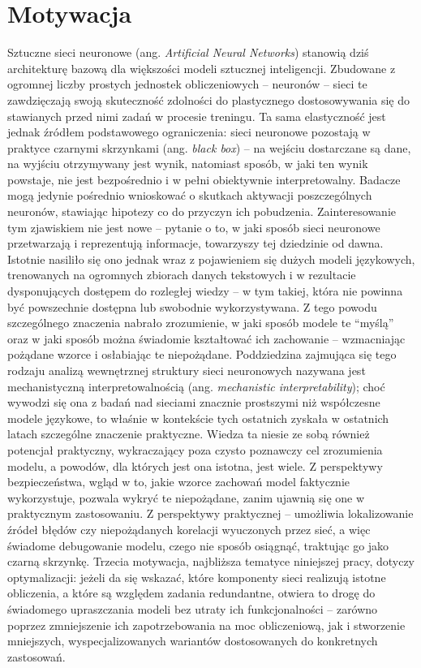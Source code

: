 \section{Motywacja}
\label{sec:motywacja}
Sztuczne sieci neuronowe (ang. \textit{Artificial Neural Networks}) stanowią dziś architekturę bazową dla większości modeli sztucznej inteligencji. Zbudowane z ogromnej liczby prostych jednostek obliczeniowych -- neuronów -- sieci te zawdzięczają swoją skuteczność zdolności do plastycznego dostosowywania się do stawianych przed nimi zadań w procesie treningu. Ta sama elastyczność jest jednak źródłem podstawowego ograniczenia: sieci neuronowe pozostają w praktyce czarnymi skrzynkami (ang. \textit{black box}) -- na wejściu dostarczane są dane, na wyjściu otrzymywany jest wynik, natomiast sposób, w jaki ten wynik powstaje, nie jest bezpośrednio i w pełni obiektywnie interpretowalny. Badacze mogą jedynie pośrednio wnioskować o skutkach aktywacji poszczególnych neuronów, stawiając hipotezy co do przyczyn ich pobudzenia. \newline
Zainteresowanie tym zjawiskiem nie jest nowe -- pytanie o to, w jaki sposób sieci neuronowe przetwarzają i reprezentują informacje, towarzyszy tej dziedzinie od dawna. Istotnie nasiliło się ono jednak wraz z pojawieniem się dużych modeli językowych, trenowanych na ogromnych zbiorach danych tekstowych i w rezultacie dysponujących dostępem do rozległej wiedzy -- w tym takiej, która nie powinna być powszechnie dostępna lub swobodnie wykorzystywana. Z tego powodu szczególnego znaczenia nabrało zrozumienie, w jaki sposób modele te \enquote{myślą} oraz w jaki sposób można świadomie kształtować ich zachowanie -- wzmacniając pożądane wzorce i osłabiając te niepożądane. Poddziedzina zajmująca się tego rodzaju analizą wewnętrznej struktury sieci neuronowych nazywana jest mechanistyczną interpretowalnością (ang. \textit{mechanistic interpretability}); choć wywodzi się ona z badań nad sieciami znacznie prostszymi niż współczesne modele językowe, to właśnie w kontekście tych ostatnich zyskała w ostatnich latach szczególne znaczenie praktyczne. \newline
Wiedza ta niesie ze sobą również potencjał praktyczny, wykraczający poza czysto poznawczy cel zrozumienia modelu, a powodów, dla których jest ona istotna, jest wiele. Z perspektywy bezpieczeństwa, wgląd w to, jakie wzorce zachowań model faktycznie wykorzystuje, pozwala wykryć te niepożądane, zanim ujawnią się one w praktycznym zastosowaniu. Z perspektywy praktycznej -- umożliwia lokalizowanie źródeł błędów czy niepożądanych korelacji wyuczonych przez sieć, a więc świadome debugowanie modelu, czego nie sposób osiągnąć, traktując go jako czarną skrzynkę. \newline
Trzecia motywacja, najbliższa tematyce niniejszej pracy, dotyczy optymalizacji: jeżeli da się wskazać, które komponenty sieci realizują istotne obliczenia, a które są względem zadania redundantne, otwiera to drogę do świadomego upraszczania modeli bez utraty ich funkcjonalności -- zarówno poprzez zmniejszenie ich zapotrzebowania na moc obliczeniową, jak i stworzenie mniejszych, wyspecjalizowanych wariantów dostosowanych do konkretnych zastosowań.

